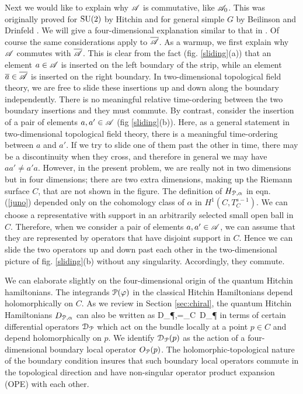 \documentclass[11pt,a4paper]{article}
\begin{document}
Next we would like to explain why $\A$ is commutative, like $\A_0$.   This was originally proved for $\SU(2)$ by Hitchin \cite{H2} and for general simple $G$ by
Beilinson and Drinfeld \cite{BD}.   We will give a four-dimensional explanation similar to that in \cite{KW}.   Of course the same considerations apply to $\bar\A$.
As a warmup, we first explain why $\A$  commutes with $\b\A$.  This is clear  from the fact (fig. \ref{sliding}(a)) that an element 
$a\in \A$ is inserted on the left boundary of the strip, while an element $\bar a\in \b\A$ is inserted on the right boundary. In two-dimensional 
topological field theory, we are free to slide these insertions up and down along the boundary independently.  There is no meaningful relative time-ordering
between the two boundary insertions and they must commute.   By contrast, consider the insertion of a pair of elements $a,a'\in\A$ (fig \ref{sliding}(b)).  Here, as
a general statement in two-dimensional topological field theory, there is a meaningful time-ordering between $a$ and $a'$.
If we try to slide one of them past the other in time, there may be a discontinuity when they cross, and therefore in general we may have $aa'\not=a'a$.
However, in the present problem, we are really not in two dimensions but in four dimensions; there are two
extra dimensions, making up the Riemann surface $C$, that are not shown in the figure.   The definition of $H_{\P,\alpha}$ in eqn. (\ref{juno}) depended only
on the cohomology class of $\alpha$ in $H^1(C,T_C^{s-1})$.   We can choose a representative with support in an arbitrarily selected small open ball in $C$.
Therefore, when we consider a pair of elements $a,a'\in \A$, we can assume that they are represented by operators that
 have disjoint support in $C$.   Hence we can slide the two operators
up and down past each other in the two-dimensional picture of fig. \ref{sliding}(b) without any singularity.  Accordingly, they commute.

We can elaborate slightly on the four-dimensional origin of the quantum Hitchin hamiltonians. The integrands $\P(\varphi)$ in the classical Hitchin Hamiltonians depend holomorphically on $C$. As we review in Section \ref{sec:chiral}, the quantum Hitchin Hamiltonians $D_{\P,\alpha}$ can also be written as \be\label{qjuno} D_{\P,\alpha}=\int_C \alpha \,{\cal D}_{\P} \ee
in terms of certain differential operators ${\cal D}_{\P}$ which act on the bundle locally at a point $p\in C$ and depend holomorphically on $p$.
We identify ${\cal D}_{\P}(p)$ as the action of a four-dimensional boundary local operator $O_{\P}(p)$. The holomorphic-topological nature of the boundary condition insures that such boundary local operators commute in the topological direction and have non-singular operator product expansion (OPE) with each other. 
\end{document}
